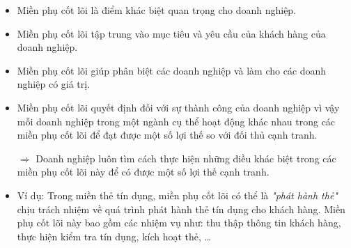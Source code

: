 \begin{itemize}

\item Miền phụ cốt lõi là điểm khác biệt quan trọng cho doanh nghiệp.

\item Miền phụ cốt lõi tập trung vào mục tiêu và yêu cầu của khách hàng của doanh nghiệp.

\item Miền phụ cốt lõi giúp phân biệt các doanh nghiệp và làm cho các doanh nghiệp có giá trị.

\item Miền phụ cốt lõi quyết định đối với sự thành công của doanh nghiệp vì vậy mỗi doanh nghiệp trong một ngành cụ thể hoạt động khác nhau trong các miền phụ cốt lõi để đạt được một số lợi thế so với đối thủ cạnh tranh.


$\Rightarrow$ Doanh nghiệp luôn tìm cách thực hiện những điều khác biệt trong các miền phụ cốt lõi này để có được một số lợi thế cạnh tranh.

\item Ví dụ: Trong miền thẻ tín dụng, miền phụ cốt lõi có thể là \textit{"phát hành thẻ"} chịu trách nhiệm về quá trình phát hành thẻ tín dụng cho khách hàng. Miền phụ cốt lõi này bao gồm các nhiệm vụ như: thu thập thông tin khách hàng, thực hiện kiểm tra tín dụng, kích hoạt thẻ, \dots


\end{itemize}


 